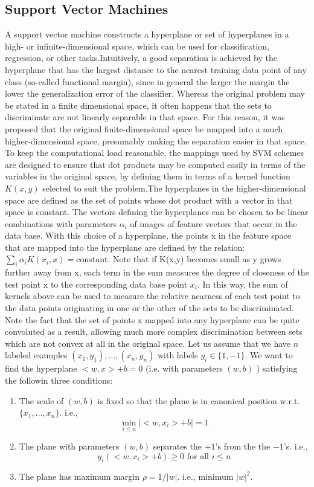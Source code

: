 \documentclass[10pt,twocolumn,letterpaper]{article}
\begin{document}
\subsection{Support Vector Machines}
A support vector machine constructs a hyperplane or set of hyperplanes in a high- or infinite-dimensional space, which can be used for classification, regression, or other tasks.Intuitively, a good separation is achieved by the hyperplane that has the largest distance to the nearest training data point of any class (so-called functional margin), since in general the larger the margin the lower the generalization error of the classifier.
Whereas the original problem may be stated in a finite dimensional space, it often happens that the sets to discriminate are not linearly separable in that space. For this reason, it was proposed that the original finite-dimensional space be mapped into a much higher-dimensional space, presumably making the separation easier in that space. To keep the computational load reasonable, the mappings used by SVM schemes are designed to ensure that dot products may be computed easily in terms of the variables in the original space, by defining them in terms of a kernel function $K(x,y)$ selected to suit the problem.The hyperplanes in the higher-dimensional space are defined as the set of points whose dot product with a vector in that space is constant. The vectors defining the hyperplanes can be chosen to be linear combinations with parameters $\alpha_i$ of images of feature vectors that occur in the data base. With this choice of a hyperplane, the points x in the feature space that are mapped into the hyperplane are defined by the relation: $\textstyle\sum_i \alpha_i K(x_i,x) = \mathrm{constant}$. Note that if K(x,y) becomes small as y grows further away from x, each term in the sum measures the degree of closeness of the test point x to the corresponding data base point $x_i$. In this way, the sum of kernels above can be used to measure the relative nearness of each test point to the data points originating in one or the other of the sets to be discriminated. Note the fact that the set of points x mapped into any hyperplane can be quite convoluted as a result, allowing much more complex discrimination between sets which are not convex at all in the original space.
Let us assume that we have $n$ labeled examples $(x_{1},y_{1}),\ldots,
(x_{n},y_{n})$ with labels $y_{i}\in \{1,-1\}$. We want to find the 
hyperplane $<w,x>+b = 0$ (i.e. with parameters $(w,b)$ ) satisfying
the followin three conditions:
\begin{enumerate}
  \item The scale of $(w,b)$ is fixed so that the plane is in canonical
        position w.r.t. $\{x_{1},\ldots,x_{n}\}$. i.e.,
\[ \min_{i\le n} | <w,x_{i}> + b | = 1 \]

  \item The plane with parameters $(w,b)$ separates the $+1$'s from the
        the $-1$'s. i.e., 
\[ y_{i} ( <w,x_{i}> + b ) \ge 0 \mbox{\ for all $i\le n$} \]

  \item The plane has maximum margin $\rho = 1/|w|$. i.e., minimum
        $|w|^{2}$.
\end{enumerate}
\end{document}
